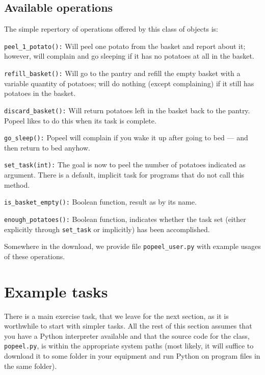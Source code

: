 \documentclass[12pt]{article}
\begin{document}
\subsection{Available operations}

The simple repertory of operations
offered by this class of objects is:

\begin{description}
\item{{\tt peel_1_potato():}} Will peel one potato
from the basket and report about it; however, will
complain and go sleeping if it has no potatoes at all
in the basket.
\item{{\tt refill_basket():}} Will go to the pantry
and refill the empty basket with a variable 
quantity of potatoes; will do nothing (except complaining)
if it still has potatoes in the basket. 
\item{{\tt discard_basket():}} Will return potatoes
left in the basket back to the pantry. Popeel likes
to do this when its task is complete. 
\item{{\tt go_sleep():}} Popeel will complain if you
wake it up after going to bed --- and then return to
bed anyhow.
\item{{\tt set_task(int):}} The goal is now to peel
the number of potatoes indicated as argument.
There is a default, implicit task for programs 
that do not call this method.
\item{{\tt is_basket_empty():}} Boolean function, 
result as by its name.
\item{{\tt enough_potatoes():}} Boolean function, indicates
whether the task set (either explicitly through {\tt set_task}
or implicitly) has been accomplished. 
\end{description}

Somewhere in the download, we provide file 
{\tt popeel_user.py} 
with example usages of these operations.


\section{Example tasks}

There is a main exercise task, that we leave for the 
next section, as
it
is worthwhile to start with simpler tasks. All
the rest of this section assumes that you have
a Python interpreter available and that the
source code for the class, {\tt popeel.py}, is within
the appropriate system paths (most likely, it will
suffice to download it to some folder in your 
equipment and run Python on program files in
the same folder).
\end{document}
